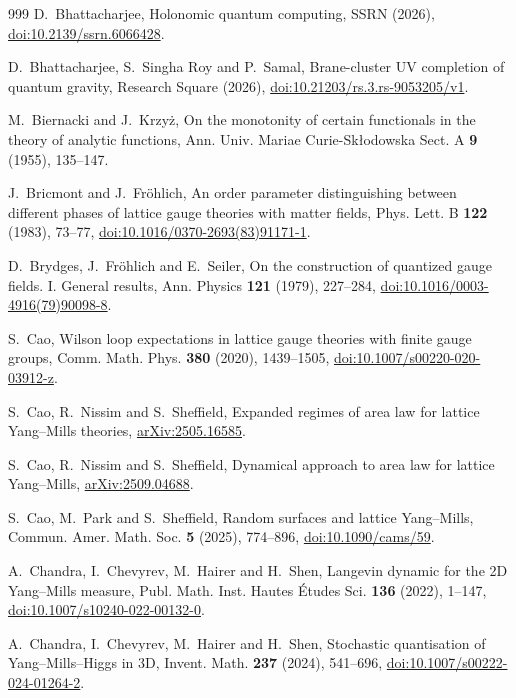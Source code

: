 \documentclass[aps,prd,twocolumn,superscriptaddress,nofootinbib,longbibliography,floatfix,amsmath,amssymb,10pt]{revtex4-2}
\theoremstyle{definition}
\theoremstyle{remark}
\begin{document}
\begin{thebibliography}{999}
D.~Bhattacharjee, Holonomic quantum computing, SSRN (2026),
\href{https://doi.org/10.2139/ssrn.6066428}{doi:10.2139/ssrn.6066428}.

D.~Bhattacharjee, S.~Singha Roy and P.~Samal, Brane-cluster UV completion of
quantum gravity, Research Square (2026),
\href{https://doi.org/10.21203/rs.3.rs-9053205/v1}
{doi:10.21203/rs.3.rs-9053205/v1}.

M.~Biernacki and J.~Krzy\.z, On the monotonity of certain functionals in the
theory of analytic functions, Ann. Univ. Mariae Curie-Sk{\l}odowska Sect. A
\textbf{9} (1955), 135--147.

J.~Bricmont and J.~Fr\"ohlich, An order parameter distinguishing between
different phases of lattice gauge theories with matter fields, Phys. Lett.
B \textbf{122} (1983), 73--77,
\href{https://doi.org/10.1016/0370-2693(83)91171-1}{doi:10.1016/0370-2693(83)91171-1}.

D.~Brydges, J.~Fr\"ohlich and E.~Seiler, On the construction of quantized
gauge fields. I. General results, Ann. Physics \textbf{121} (1979),
227--284, \href{https://doi.org/10.1016/0003-4916(79)90098-8}
{doi:10.1016/0003-4916(79)90098-8}.

S.~Cao, Wilson loop expectations in lattice gauge theories with finite
gauge groups, Comm. Math. Phys. \textbf{380} (2020), 1439--1505,
\href{https://doi.org/10.1007/s00220-020-03912-z}{doi:10.1007/s00220-020-03912-z}.

S.~Cao, R.~Nissim and S.~Sheffield, Expanded regimes of area law for
lattice Yang--Mills theories,
\href{https://arxiv.org/abs/2505.16585}{arXiv:2505.16585}.

S.~Cao, R.~Nissim and S.~Sheffield, Dynamical approach to area law for lattice
Yang--Mills, \href{https://arxiv.org/abs/2509.04688}{arXiv:2509.04688}.

S.~Cao, M.~Park and S.~Sheffield, Random surfaces and lattice Yang--Mills,
Commun. Amer. Math. Soc. \textbf{5} (2025), 774--896,
\href{https://doi.org/10.1090/cams/59}{doi:10.1090/cams/59}.

A.~Chandra, I.~Chevyrev, M.~Hairer and H.~Shen, Langevin dynamic for the 2D
Yang--Mills measure, Publ. Math. Inst. Hautes \'Etudes Sci. \textbf{136}
(2022), 1--147,
\href{https://doi.org/10.1007/s10240-022-00132-0}{doi:10.1007/s10240-022-00132-0}.

A.~Chandra, I.~Chevyrev, M.~Hairer and H.~Shen, Stochastic quantisation of
Yang--Mills--Higgs in 3D, Invent. Math. \textbf{237} (2024), 541--696,
\href{https://doi.org/10.1007/s00222-024-01264-2}{doi:10.1007/s00222-024-01264-2}.


\end{thebibliography}
\end{document}
